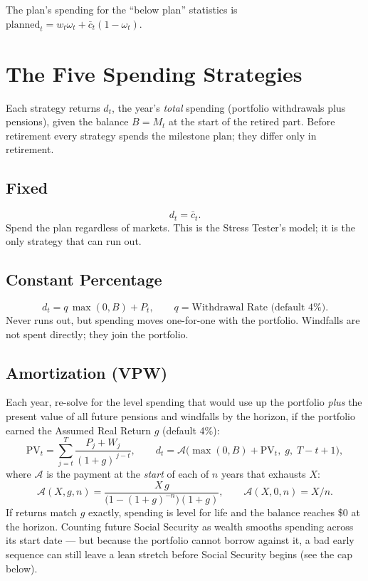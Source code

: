 \documentclass[11pt,letterpaper]{article}
\begin{document}
The plan's spending for the ``below plan'' statistics is $\text{planned}_t = w_t\omega_t + \bar c_t(1-\omega_t)$.

\section{The Five Spending Strategies}
\label{sec:strategies}

Each strategy returns $d_t$, the year's \emph{total} spending (portfolio withdrawals plus pensions), given the balance $B=M_t$ at the start of the retired part. Before retirement every strategy spends the milestone plan; they differ only in retirement.

\subsection{Fixed}
\begin{equation}
d_t = \bar c_t .
\end{equation}
Spend the plan regardless of markets. This is the Stress Tester's model; it is the only strategy that can run out.

\subsection{Constant Percentage}
\begin{equation}
d_t = q\,\max(0,B) + P_t, \qquad q = \text{Withdrawal Rate (default 4\%)}.
\end{equation}
Never runs out, but spending moves one-for-one with the portfolio. Windfalls are not spent directly; they join the portfolio.

\subsection{Amortization (VPW)}
Each year, re-solve for the level spending that would use up the portfolio \emph{plus} the present value of all future pensions and windfalls by the horizon, if the portfolio earned the Assumed Real Return $g$ (default 4\%):
\begin{equation}
\mathrm{PV}_t = \sum_{j=t}^{T} \frac{P_j + W_j}{(1+g)^{\,j-t}}, \qquad
d_t = \mathcal{A}\!\big(\max(0,B) + \mathrm{PV}_t,\; g,\; T-t+1\big),
\end{equation}
where $\mathcal{A}$ is the payment at the \emph{start} of each of $n$ years that exhausts $X$:
\begin{equation}
\mathcal{A}(X, g, n) = \frac{X\,g}{\big(1-(1+g)^{-n}\big)(1+g)}, \qquad \mathcal{A}(X,0,n) = X/n .
\end{equation}
If returns match $g$ exactly, spending is level for life and the balance reaches \$0 at the horizon. Counting future Social Security as wealth smooths spending across its start date --- but because the portfolio cannot borrow against it, a bad early sequence can still leave a lean stretch before Social Security begins (see the cap below).
\end{document}
